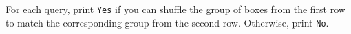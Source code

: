 For each query, print \texttt{Yes} if you can shuffle the group of boxes from the first row to match the corresponding group from the second row. Otherwise, print \texttt{No}.